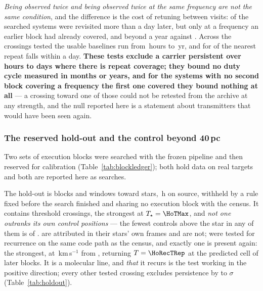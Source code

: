 \emph{Being observed twice and being observed twice at the same frequency are
not the same condition}, and the difference is the cost of retuning between
visits: of the \RcSearchSysAll{} searched systems \RcRevSysAllDay{} were
revisited more than a day later, but only \RcConfSysAllDay{} at a frequency an
earlier block had already covered, and beyond a year \RcRevSysAllYr{} against
\RcConfSysAllYr. Across the crossings tested the usable baselines run from
\RcSepMinH\,hours to \RcSepMaxYr\,yr, and for \RcNSepSameDay{} of
\RcNTested{} the nearest repeat falls within a day. \textbf{These tests
exclude a carrier persistent over hours to days where there is repeat
coverage; they bound no duty cycle measured in months or years, and for the
\RcNoRepSysAll{} systems with no second block covering a frequency the first
one covered they bound nothing at all} --- a crossing toward one of those
could not be retested from the archive at any strength, and the null reported
here is a statement about transmitters that would have been seen again.

\subsubsection{The reserved hold-out and the control beyond 40\,pc}
\label{sec:holdoutsearch}

Two sets of execution blocks were searched with the frozen pipeline and then
reserved for calibration (Table~\ref{tab:blockledger}); both hold data on real
targets and both are reported here as searches.

The hold-out is \HoNBlock{} blocks and \HoNWin{} windows toward \HoNStar{}
stars, \HoHours\,h on source, withheld by a rule fixed before the search
finished and sharing no execution block with the census. It contains
\HoNCross{} threshold crossings, the strongest at $T_\star=\HoTMax$, and
\emph{not one outranks its own control positions} --- the fewest controls above
the star in any of them is \HoNCtrlMin{} of \NCtrl. \HoNAttr{} are attributed
in their stars' own frames and \HoNUnattr{} are not; \HoNTested{} were tested
for recurrence on the same code path as the census, and exactly one is present
again: the strongest, \HoRecStar{} at \HoRecDv\,km\,s$^{-1}$ from
\HoRecLine, returning $T=\HoRecTRep$ at the predicted cell of \HoRecNRep{}
later blocks. It is a molecular line, and \emph{that} it recurs is the test
working in the positive direction; every other tested crossing excludes
persistence by \HoExclMin{} to \HoExclMax$\sigma$ (Table~\ref{tab:holdout}).

